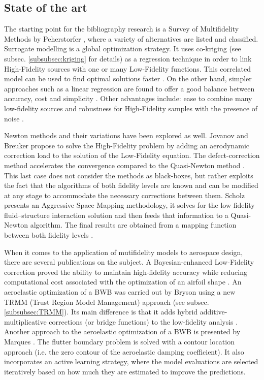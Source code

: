 \subsection{State of the art}
\label{subsec:sota}
The starting point for the bibliography research is a Survey of Multifidelity Methods by Peherstorfer \cite{peherstorfer2018survey}, where a variety of alternatives are listed and classified. Surrogate modelling is a global optimization strategy. It uses co-kriging (see subsec. \ref{subsubsec:kriging} for details) as a regression technique in order to link High-Fidelity sources with one or many Low-Fidelity functions. This correlated model can be used to find optimal solutions faster \cite{Forrester2007}. On the other hand, simpler approaches such as a linear regression are found to offer a good balance between accuracy, cost and simplicity \cite{Zhang2019}. Other advantages include: ease to combine many low-fidelity sources and robustness for High-Fidelity samples with the presence of noise \cite{Zhang2019}. 

Newton methods and their variations have been explored as well. Jovanov and Breuker propose to solve the High-Fidelity problem by adding an aerodynamic correction load to the solution of the Low-Fidelity equation. The defect-correction method accelerates the convergence compared to the Quasi-Newton method \cite{Jovanov2015}. This last case does not consider the methods as black-boxes, but rather exploits the fact that the algorithms of both fidelity levels are known and can be modified at any stage to accommodate the necessary corrections between them. Scholz presents an Aggressive Space Mapping methodology, it solves for the low fidelity fluid–structure interaction solution and then feeds that information to a Quasi-Newton algorithm. The final results are obtained from a mapping function between both fidelity levels \cite{Scholcz2014}. 

When it comes to the application of mutifidelity models to aerospace design, there are several publications on the subject. A Bayesian-enhanced Low-Fidelity correction proved the ability to maintain high-fidelity accuracy while reducing computational cost associated with the optimization of an airfoil shape \cite{fischer2018bayesian}. An aeroelastic optimization of a BWB was carried out by Bryson \cite{Bryson2019} using a new TRMM (Trust Region Model Management) approach (see subsec. \ref{subsubsec:TRMM}). Its main difference is that it adds hybrid additive-multiplicative corrections (or bridge functions) to the low-fidelity analysis \cite{Bryson2019a}. Another approach to the aeroelastic optimization of a BWB is presented by Marques \cite{Marques2019}. The flutter boundary problem is solved with a contour location approach (i.e. the zero contour of the aeroelastic damping coefficient). It also incorporates an active learning strategy, where the model evaluations are selected iteratively based on how much they are estimated to improve the predictions.

